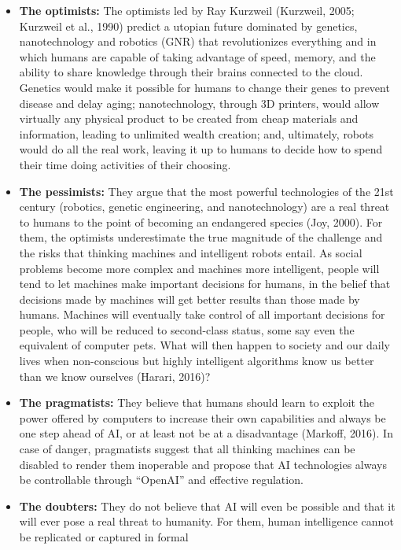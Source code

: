 \documentclass[
  letterpaper,
  DIV=11,
  numbers=noendperiod]{scrreprt}
\begin{document}
\begin{itemize}
\item
  \textbf{The optimists:} The optimists led by Ray Kurzweil (Kurzweil,
  2005; Kurzweil et al., 1990) predict a utopian future dominated by
  genetics, nanotechnology and robotics (GNR) that revolutionizes
  everything and in which humans are capable of taking advantage of
  speed, memory, and the ability to share knowledge through their brains
  connected to the cloud. Genetics would make it possible for humans to
  change their genes to prevent disease and delay aging; nanotechnology,
  through 3D printers, would allow virtually any physical product to be
  created from cheap materials and information, leading to unlimited
  wealth creation; and, ultimately, robots would do all the real work,
  leaving it up to humans to decide how to spend their time doing
  activities of their choosing.
\item
  \textbf{The pessimists:} They argue that the most powerful
  technologies of the 21st century (robotics, genetic engineering, and
  nanotechnology) are a real threat to humans to the point of becoming
  an endangered species (Joy, 2000). For them, the optimists
  underestimate the true magnitude of the challenge and the risks that
  thinking machines and intelligent robots entail. As social problems
  become more complex and machines more intelligent, people will tend to
  let machines make important decisions for humans, in the belief that
  decisions made by machines will get better results than those made by
  humans. Machines will eventually take control of all important
  decisions for people, who will be reduced to second-class status, some
  say even the equivalent of computer pets. What will then happen to
  society and our daily lives when non-conscious but highly intelligent
  algorithms know us better than we know ourselves (Harari, 2016)?
\item
  \textbf{The pragmatists:} They believe that humans should learn to
  exploit the power offered by computers to increase their own
  capabilities and always be one step ahead of AI, or at least not be at
  a disadvantage (Markoff, 2016). In case of danger, pragmatists suggest
  that all thinking machines can be disabled to render them inoperable
  and propose that AI technologies always be controllable through
  ``OpenAI'' and effective regulation.
\item
  \textbf{The doubters:} They do not believe that AI will even be
  possible and that it will ever pose a real threat to humanity. For
  them, human intelligence cannot be replicated or captured in formal

\end{itemize}
\end{document}
